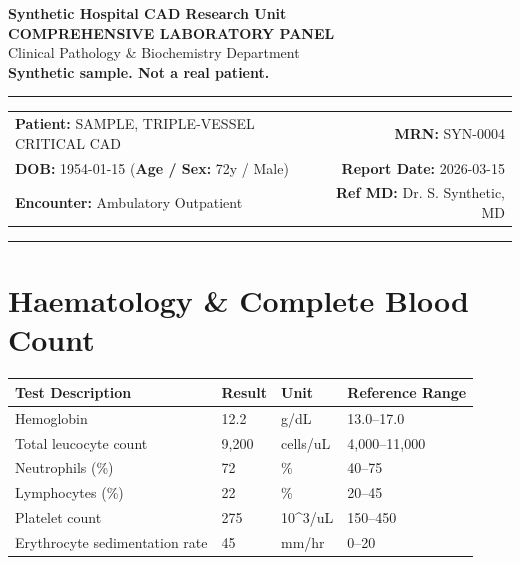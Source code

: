 \documentclass[10pt,a4paper]{article}
\begin{document}
\begin{center}
  {\Large \textbf{Synthetic Hospital CAD Research Unit}}\\
  \vspace{2pt}
  {\normalsize \textbf{COMPREHENSIVE LABORATORY PANEL}}\\
  \vspace{1pt}
  {\footnotesize \textcolor{subtext}{Clinical Pathology \& Biochemistry Department}}\\
  \vspace{4pt}
  {\small \textbf{\textcolor{red!75!black}{Synthetic sample. Not a real patient.}}}\\
  \vspace{3pt}
  \textcolor{linecolor}{\rule{\textwidth}{0.8pt}}
\end{center}

\vspace{2pt}

\noindent
\begin{tabular*}{\textwidth}{@{} l @{\extracolsep{\fill}} r @{}}
  \textbf{Patient:} SAMPLE, TRIPLE-VESSEL CRITICAL CAD & \textbf{MRN:} SYN-0004 \\
  \textbf{DOB:} 1954-01-15 \quad (\textbf{Age / Sex:} 72y / Male) & \textbf{Report Date:} 2026-03-15 \\
  \textbf{Encounter:} Ambulatory Outpatient & \textbf{Ref MD:} Dr. S. Synthetic, MD \\
\end{tabular*}

\vspace{2pt}
\noindent\textcolor{linecolor}{\rule{\textwidth}{0.4pt}}
\vspace{6pt}


\section*{Haematology \& Complete Blood Count}

\begin{tabular}{@{} p{6.4cm} p{2.5cm} p{2.5cm} p{3.1cm} @{}}
  \toprule
  \textbf{Test Description} & \textbf{Result} & \textbf{Unit} & \textbf{Reference Range} \\
  \midrule
  Hemoglobin & 12.2 & g/dL & 13.0--17.0 \\
  Total leucocyte count & 9,200 & cells/uL & 4,000--11,000 \\
  Neutrophils (\%) & 72 & \% & 40--75 \\
  Lymphocytes (\%) & 22 & \% & 20--45 \\
  Platelet count & 275 & 10\textasciicircum 3/uL & 150--450 \\
  Erythrocyte sedimentation rate & 45 & mm/hr & 0--20 \\
  \bottomrule
\end{tabular}
\end{document}
